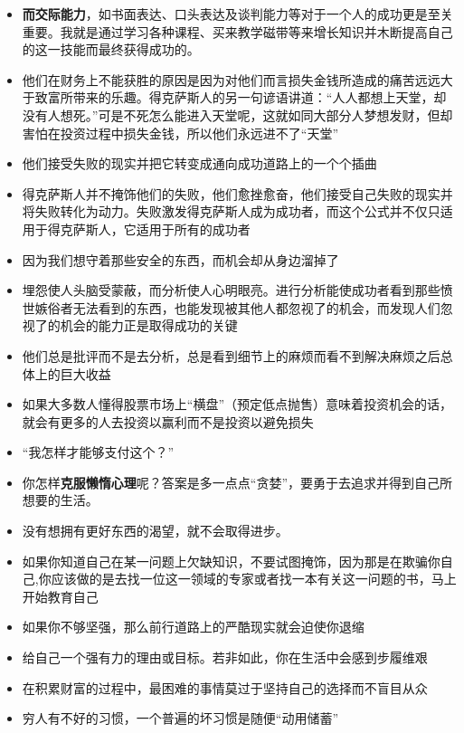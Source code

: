 \documentclass[UTF8,a4paper,8pt]{ctexart}
\begin{document}
\begin{itemize}
 	\item \textbf{而交际能力}，如书面表达、口头表达及谈判能力等对于一个人的成功更是至关重要。我就是通过学习各种课程、买来教学磁带等来增长知识并木断提高自己的这一技能而最终获得成功的。
 	\item 他们在财务上不能获胜的原因是因为对他们而言损失金钱所造成的痛苦远远大于致富所带来的乐趣。得克萨斯人的另一句谚语讲道：“人人都想上天堂，却没有人想死。”可是不死怎么能进入天堂呢，这就如同大部分人梦想发财，但却害怕在投资过程中损失金钱，所以他们永远进不了“天堂”
 	\item 他们接受失败的现实并把它转变成通向成功道路上的一个个插曲
 	\item 得克萨斯人并不掩饰他们的失败，他们愈挫愈奋，他们接受自己失败的现实并将失败转化为动力。失败激发得克萨斯人成为成功者，而这个公式并不仅只适用于得克萨斯人，它适用于所有的成功者
 	\item 因为我们想守着那些安全的东西，而机会却从身边溜掉了
 	\item 埋怨使人头脑受蒙蔽，而分析使人心明眼亮。进行分析能使成功者看到那些愤世嫉俗者无法看到的东西，也能发现被其他人都忽视了的机会，而发现人们忽视了的机会的能力正是取得成功的关键
 	\item 他们总是批评而不是去分析，总是看到细节上的麻烦而看不到解决麻烦之后总体上的巨大收益
 	\item 如果大多数人懂得股票市场上“横盘”（预定低点抛售）意味着投资机会的话，就会有更多的人去投资以赢利而不是投资以避免损失
 	\item “我怎样才能够支付这个？”
 	\item 你怎样\textbf{克服懒惰心理}呢？答案是多一点点“贪婪”，要勇于去追求并得到自己所想要的生活。
 	\item 没有想拥有更好东西的渴望，就不会取得进步。
 	\item 如果你知道自己在某一问题上欠缺知识，不要试图掩饰，因为那是在欺骗你自己,你应该做的是去找一位这一领域的专家或者找一本有关这一问题的书，马上开始教育自己
 	\item 如果你不够坚强，那么前行道路上的严酷现实就会迫使你退缩
 	\item 给自己一个强有力的理由或目标。若非如此，你在生活中会感到步履维艰
 	\item 在积累财富的过程中，最困难的事情莫过于坚持自己的选择而不盲目从众
 	\item 穷人有不好的习惯，一个普遍的坏习惯是随便“动用储蓄”
 	

\end{itemize}
\end{document}
